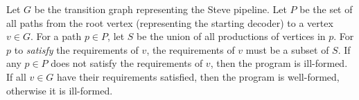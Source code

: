 Let $G$ be the transition graph representing the Steve pipeline.
Let $P$ be the set of all paths from the root vertex (representing the starting decoder) to a vertex $v \in G$.
For a path $p \in P$, let $S$ be the union of all productions of vertices in $p$.
For $p$ to \emph{satisfy} the requirements of $v$,
the requirements of $v$ must be a subset of $S$.
If any $p \in P$ does not satisfy the requirements of $v$, then the program
is ill-formed. If all $v \in G$ have their requirements
satisfied, then the program is well-formed, otherwise it is ill-formed.

%
%

%
%
%

